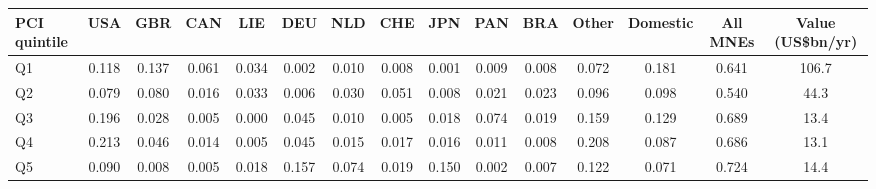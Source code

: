 \begin{tabular}{lcccccccccccccc}
\toprule
PCI quintile & USA & GBR & CAN & LIE & DEU & NLD & CHE & JPN & PAN & BRA & Other & Domestic & All MNEs & Value (US\$bn/yr) \\
\midrule
Q1 & 0.118 & 0.137 & 0.061 & 0.034 & 0.002 & 0.010 & 0.008 & 0.001 & 0.009 & 0.008 & 0.072 & 0.181 & 0.641 & 106.7 \\
Q2 & 0.079 & 0.080 & 0.016 & 0.033 & 0.006 & 0.030 & 0.051 & 0.008 & 0.021 & 0.023 & 0.096 & 0.098 & 0.540 & 44.3 \\
Q3 & 0.196 & 0.028 & 0.005 & 0.000 & 0.045 & 0.010 & 0.005 & 0.018 & 0.074 & 0.019 & 0.159 & 0.129 & 0.689 & 13.4 \\
Q4 & 0.213 & 0.046 & 0.014 & 0.005 & 0.045 & 0.015 & 0.017 & 0.016 & 0.011 & 0.008 & 0.208 & 0.087 & 0.686 & 13.1 \\
Q5 & 0.090 & 0.008 & 0.005 & 0.018 & 0.157 & 0.074 & 0.019 & 0.150 & 0.002 & 0.007 & 0.122 & 0.071 & 0.724 & 14.4 \\
\bottomrule
\end{tabular}
